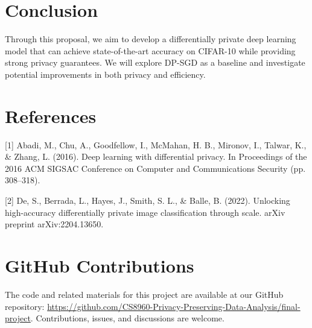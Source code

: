 \documentclass{article}
\begin{document}
\section{Conclusion}
Through this proposal, we aim to develop a differentially private deep learning model that can achieve state-of-the-art accuracy on CIFAR-10 while providing strong privacy guarantees. We will explore DP-SGD as a baseline and investigate potential improvements in both privacy and efficiency.

\section*{References}
\small{
[1] Abadi, M., Chu, A., Goodfellow, I., McMahan, H. B., Mironov, I., Talwar, K., \& Zhang, L. (2016). Deep learning with differential privacy. In Proceedings of the 2016 ACM SIGSAC Conference on Computer and Communications Security (pp. 308–318).

[2] De, S., Berrada, L., Hayes, J., Smith, S. L., \& Balle, B. (2022). Unlocking high-accuracy differentially private image classification through scale. arXiv preprint arXiv:2204.13650.
}

\section*{GitHub Contributions}
The code and related materials for this project are available at our GitHub repository: \url{https://github.com/CS8960-Privacy-Preserving-Data-Analysis/final-project}. Contributions, issues, and discussions are welcome.
\end{document}
